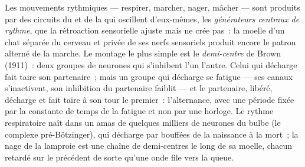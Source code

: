 \begin{proposition}\label{prop:b3:nervous-systems:cpg}
Les mouvements rythmiques --- respirer, marcher, nager, mâcher --- sont
produits par des circuits du  et de la  qui
oscillent d'eux-mêmes, les \emph{générateurs centraux de rythme}, que la
rétroaction sensorielle ajuste mais ne crée pas~: la moelle d'un chat
séparée du cerveau et privée de ses nerfs sensoriels produit encore le
patron alterné de la marche. Le montage le plus simple est le
\emph{demi-centre} de Brown (1911)~: deux groupes de neurones qui
s'inhibent l'un l'autre. Celui qui décharge fait taire son partenaire~;
mais un groupe qui décharge se fatigue --- ses canaux s'inactivent, son
inhibition du partenaire faiblit --- et le partenaire, libéré, décharge
et fait taire à son tour le premier~: l'alternance, avec une période
fixée par la constante de temps de la fatigue et non par une horloge. Le
rythme respiratoire naît dans un amas de quelques milliers de neurones
du bulbe (le complexe pré-Bötzinger), qui décharge par bouffées de la
naissance à la mort~; la nage de la lamproie est une chaîne de
demi-centres le long de sa moelle, chacun retardé sur le précédent de
sorte qu'une onde file vers la queue.
\end{proposition}

